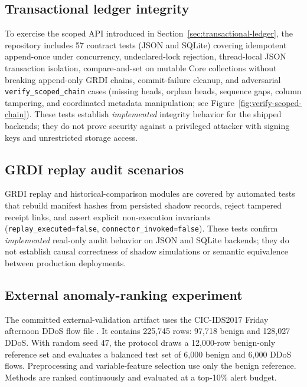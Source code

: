 \documentclass[11pt]{article}
\begin{document}
\subsection{Transactional ledger integrity}
\label{sec:txn-eval}

To exercise the scoped API introduced in Section~\ref{sec:transactional-ledger},
the repository includes 57 contract tests (JSON and SQLite) covering idempotent
append-once under concurrency, undeclared-lock rejection, thread-local JSON
transaction isolation, compare-and-set on mutable Core collections without
breaking append-only GRDI chains, commit-failure cleanup, and adversarial
\texttt{verify\_scoped\_chain} cases (missing heads, orphan heads, sequence
gaps, column tampering, and coordinated metadata manipulation; see
Figure~\ref{fig:verify-scoped-chain}). These tests establish \emph{implemented} integrity behavior for the shipped backends; they
do not prove security against a privileged attacker with signing keys and
unrestricted storage access.

\subsection{GRDI replay audit scenarios}
\label{sec:grdi-eval}

GRDI replay and historical-comparison modules are covered by automated tests
that rebuild manifest hashes from persisted shadow records, reject tampered
receipt links, and assert explicit non-execution invariants
(\texttt{replay\_executed=false}, \texttt{connector\_invoked=false}).
These tests confirm \emph{implemented} read-only audit behavior on JSON and
SQLite backends; they do not establish causal correctness of shadow
simulations or semantic equivalence between production deployments.

\subsection{External anomaly-ranking experiment}

The committed external-validation artifact uses the CIC-IDS2017 Friday
afternoon DDoS flow file \cite{sharafaldin2018cicids}. It contains 225,745
rows: 97,718 benign and 128,027 DDoS. With random seed 47, the protocol draws a
12,000-row benign-only reference set and evaluates a balanced test set of
6,000 benign and 6,000 DDoS flows. Preprocessing and variable-feature selection
use only the benign reference. Methods are ranked continuously and evaluated
at a top-10\% alert budget.
\end{document}
